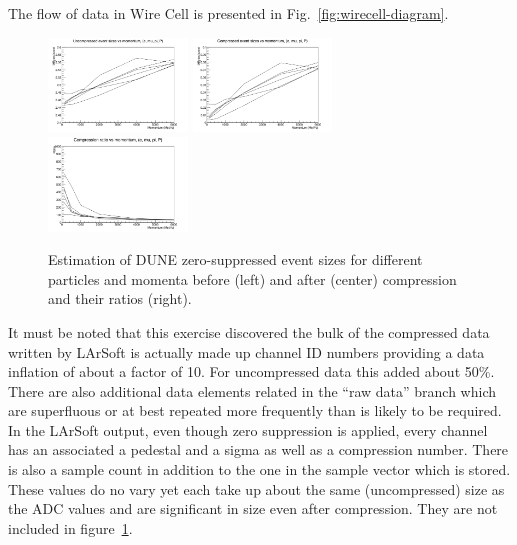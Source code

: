 The flow of data in Wire Cell is presented in Fig.~\ref{fig:wirecell-diagram}.
\begin{figure}
	\includegraphics[width=0.33\textwidth]{btot.png}
	\includegraphics[width=0.33\textwidth]{bzip.png}
	\includegraphics[width=0.33\textwidth]{brat.png}
	\caption{Estimation of DUNE zero-suppressed event sizes for different particles and momenta before (left) and after (center)  compression and their ratios (right).}
	\label{fig:data-compression}
\end{figure}




It must be noted that this exercise discovered the bulk of the
compressed data written by LArSoft is actually made up channel ID
numbers providing a data inflation of about a factor of 10.
For uncompressed data this added about 50\%.
There are also additional data elements related in the ``raw data''
branch which are superfluous or at best repeated more frequently than
is likely to be required.
In the LArSoft output, even though zero suppression is applied, every
channel has an associated a pedestal and a sigma as well as a
compression number.
There is also a sample count in addition to the one in the sample
vector which is stored.
These values do no vary yet each take up about the same (uncompressed)
size as the ADC values and are significant in size even after
compression.
They are not included in figure~\ref{fig:data-compression}.

